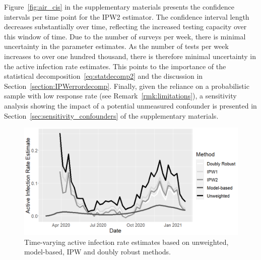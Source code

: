 \documentclass[11pt]{amsart}
\numberwithin{equation}{section}
\theoremstyle{plain}
\begin{document}
Figure~\ref{fig:air_cis} in the supplementary materials presents the confidence intervals per time point for the IPW2 estimator.  The confidence interval length decreases substantially over time, reflecting the increased testing capacity over this window of time.  Due to the number of surveys per week, there is minimal uncertainty in the parameter estimates.  As the number of tests per week increases to over one hundred thousand, there is therefore minimal uncertainty in the active infection rate estimates. This points to the importance of the statistical decomposition~\eqref{eq:statdecomp2} and the discussion in Section~\ref{section:IPWerrordecomp}. Finally, given the reliance on a probabilistic sample with low response rate (see Remark~\ref{rmk:limitations}), a sensitivity analysis showing the impact of a potential unmeasured confounder is presented in Section~\ref{sec:sensitivity_confounders} of the supplementary materials.

 \begin{figure}[!th]
 \centering
 \includegraphics[width=.7\linewidth]{../figs/tv_air.png}
 \caption{Time-varying active infection rate estimates based on unweighted, model-based, IPW and doubly robust methods.}
 \label{fig:tvestimates}
 \end{figure}
\end{document}
